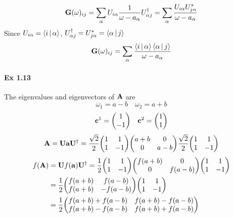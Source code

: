 \documentclass[a4paper]{article}
\newcommand{\ex}[1]{\paragraph{Ex #1}}
\numberwithin{equation}{subsection}
\begin{document}
\begin{equation}\label{key}
\vb{G}(\omega)_{ij} = \sum_\alpha U_{i\alpha}\dfrac{1}{\omega-a_\alpha}U^\dagger_{\alpha j} = \sum_\alpha \dfrac{U_{i\alpha}U_{j\alpha}^*}{\omega-a_\alpha}
\end{equation}
Since $U_{i\alpha} = \Braket{i | \alpha}  $, $ U^\dagger_{\alpha j} = U_{j\alpha}^* = \Braket{\alpha | j} $
\begin{equation}\label{key}
\vb{G}(\omega)_{ij} = \sum_\alpha \dfrac{\Braket{i | \alpha} \Braket{\alpha | j}}{\omega-a_\alpha}
\end{equation}
\ex{1.13}
The eigenvalues and eigenvectors of $ \vb{A} $ are
\begin{equation}\label{key}
\omega_1 = a-b \quad \omega_2 = a+b
\end{equation}
\begin{equation}\label{key}
\vb{c}^1 = \mqty(1\\ -1) \quad \vb{c}^2 = \mqty(1\\ 1)
\end{equation}
\begin{equation}\label{key}
\vb{A} = \vb{U}\vb{a}\vb{U}^\dagger 
=\dfrac{\sqrt{2}}{2}\mqty(1 & 1\\1 & -1)\mqty(a+b & 0\\0 & a-b) \dfrac{\sqrt{2}}{2}\mqty(1 & 1\\1 & -1)
\end{equation}
\begin{equation}\label{key}
\begin{aligned}
f(\vb{A}) &= \vb{U}f(\vb{a})\vb{U}^\dagger = \dfrac{1}{2}\mqty(1 & 1\\1 & -1) \mqty(f(a+b) & 0\\0 & f(a-b)) \mqty(1 & 1\\1 & -1)\\
&= \dfrac{1}{2}\mqty(f(a+b) & f(a-b)\\ f(a+b) & -f(a-b)) \mqty(1 & 1\\1 & -1)\\
&= \dfrac{1}{2}\mqty(f(a+b)+f(a-b) & f(a+b)-f(a-b) \\ f(a+b)-f(a-b) & f(a+b)+f(a-b) )
\end{aligned}
\end{equation}
\end{document}
